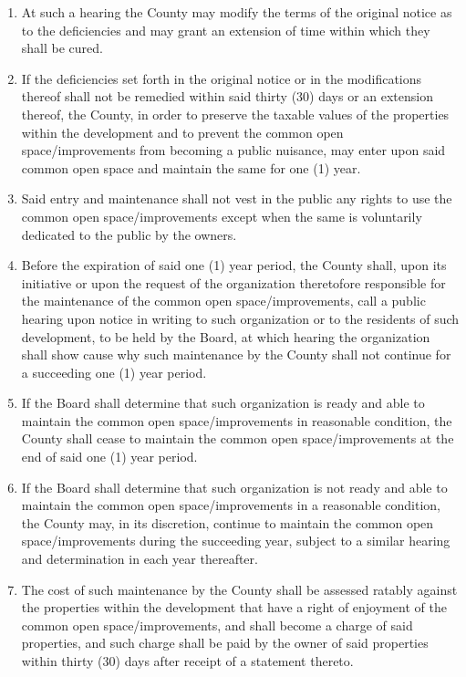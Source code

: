 \documentclass[10pt, letterpaper]{article}
\begin{document}
\begin{enumerate}
\begin{enumerate}
      \item At such a hearing the County may modify the terms of the original notice as to the deficiencies and may grant an extension of time within which they shall be cured.
      \item If the deficiencies set forth in the original notice or in the modifications thereof shall not be remedied within said thirty (30) days or an extension thereof, the County, in order to preserve the taxable values of the properties within the development and to prevent the common open space/improvements from becoming a public nuisance, may enter upon said common open space and maintain the same for one (1) year.
      \item Said entry and maintenance shall not vest in the public any rights to use the common open space/improvements except when the same is voluntarily dedicated to the public by the owners.
      \item Before the expiration of said one (1) year period, the County shall, upon its initiative or upon the request of the organization theretofore responsible for the maintenance of the common open space/improvements, call a public hearing upon notice in writing to such organization or to the residents of such development, to be held by the Board, at which hearing the organization shall show cause why such maintenance by the County shall not continue for a succeeding one (1) year period.
      \item If the Board shall determine that such organization is ready and able to maintain the common open space/improvements in reasonable condition, the County shall cease to maintain the common open space/improvements at the end of said one (1) year period.
      \item If the Board shall determine that such organization is not ready and able to maintain the common open space/improvements in a reasonable condition, the County may, in its discretion, continue to maintain the common open space/improvements during the succeeding year, subject to a similar hearing and determination in each year thereafter.
      \item The cost of such maintenance by the County shall be assessed ratably against the properties within the development that have a right of enjoyment of the common open space/improvements, and shall become a charge of said properties, and such charge shall be paid by the owner of said properties within thirty (30) days after receipt of a statement thereto.
    \end{enumerate}
\end{enumerate}
\end{document}
